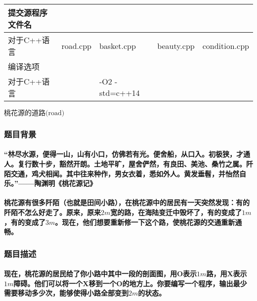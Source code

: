 \documentclass[final,11pt,oneside,UTF8]{report}
\begin{document}
\begin{table}[h]
\begin{tabular}{lllll}
        提交源程序文件名                      &                               &                                    &                                 &                                    \\ \hline
        \multicolumn{1}{|l|}{对于C++语言} & \multicolumn{1}{l|}{road.cpp} & \multicolumn{1}{l|}{basket.cpp}    & \multicolumn{1}{l|}{beauty.cpp} & \multicolumn{1}{l|}{condition.cpp} \\ \hline
        编译选项                          &                               &                                    &                                 &                                    \\ \hline
        \multicolumn{1}{|l|}{对于C++语言} & \multicolumn{1}{l}{}          & \multicolumn{1}{l}{-O2 -std=c++14} & \multicolumn{1}{l}{}            & \multicolumn{1}{l|}{}              \\ \hline
    \end{tabular}
\end{table}
\newpage

\centerline{\LARGE{$\textbf{桃花源的道路}\text{(road)}$}}
\subsubsection{题目背景}
\paragraph{
    “林尽水源，便得一山，山有小口，仿佛若有光。便舍船，从口入。初极狭，才通人。复行数十步，豁然开朗。土地平旷，屋舍俨然，有良田、美池、桑竹之属。阡陌交通，鸡犬相闻。其中往来种作，男女衣着，悉如外人。黄发垂髫，并怡然自乐。”——陶渊明《桃花源记》
}
\paragraph{
    桃花源有很多阡陌（也就是田间小路），在桃花源中的居民有一天突然发现：有的阡陌不怎么好走了。原来，原来$2m$宽的路，在海陆变迁中毁坏了，有的变成了$1m$，有的变成了$3m$。现在，他们想要重新修一下这个路，使桃花源的交通重新通畅。
}
\subsubsection{题目描述}
\paragraph{
    现在，桃花源的居民给了你小路中其中一段的剖面图，用O表示$1m$路，用X表示$1m$障碍。他们可以将一个X移到一个O的地方上。你要编写一个程序，输出最少需要移动多少次，能够使得小路全部变到$2m$的状态。
}
\end{document}
